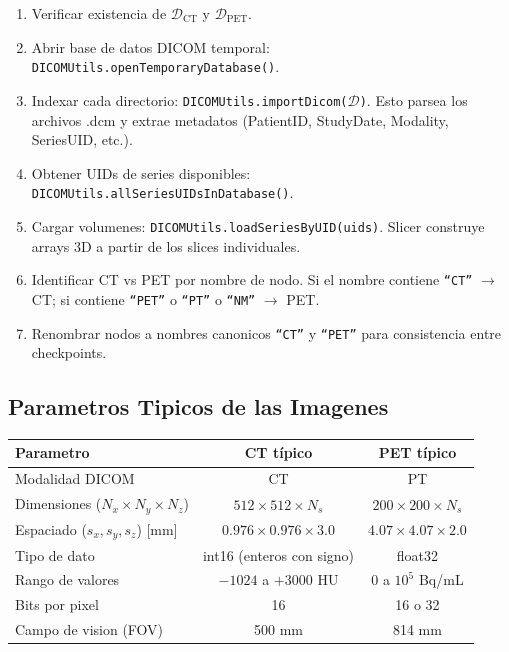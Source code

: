 \documentclass[12pt,a4paper]{article}
\begin{document}
\begin{enumerate}
    \item Verificar existencia de $\mathcal{D}_{\text{CT}}$ y $\mathcal{D}_{\text{PET}}$.
    \item Abrir base de datos DICOM temporal:
          \texttt{DICOMUtils.openTemporaryDatabase()}.
    \item Indexar cada directorio:
          \texttt{DICOMUtils.importDicom($\mathcal{D}$)}.
          Esto parsea los archivos .dcm y extrae metadatos (PatientID,
          StudyDate, Modality, SeriesUID, etc.).
    \item Obtener UIDs de series disponibles:
          \texttt{DICOMUtils.allSeriesUIDsInDatabase()}.
    \item Cargar volumenes:
          \texttt{DICOMUtils.loadSeriesByUID(uids)}.
          Slicer construye arrays 3D a partir de los slices individuales.
    \item Identificar CT vs PET por nombre de nodo.
          Si el nombre contiene \texttt{``CT''} $\to$ CT;
          si contiene \texttt{``PET''} o \texttt{``PT''} o \texttt{``NM''} $\to$ PET.
    \item Renombrar nodos a nombres canonicos \texttt{``CT''} y \texttt{``PET''}
          para consistencia entre checkpoints.
\end{enumerate}

\subsection{Parametros Tipicos de las Imagenes}

\begin{table}[H]
\centering
\begin{tabular}{l c c}
\toprule
\textbf{Parametro} & \textbf{CT típico} & \textbf{PET típico} \\
\midrule
Modalidad DICOM & CT & PT \\
Dimensiones ($N_x \times N_y \times N_z$) & $512 \times 512 \times N_s$ & $200 \times 200 \times N_s$ \\
Espaciado ($s_x, s_y, s_z$) [mm] & $0.976 \times 0.976 \times 3.0$ & $4.07 \times 4.07 \times 2.0$ \\
Tipo de dato & int16 (enteros con signo) & float32 \\
Rango de valores & $-1024$ a $+3000$ HU & $0$ a $10^5$ Bq/mL \\
Bits por pixel & 16 & 16 o 32 \\
Campo de vision (FOV) & 500 mm & 814 mm \\
\bottomrule
\end{tabular}
\end{table}
\end{document}
